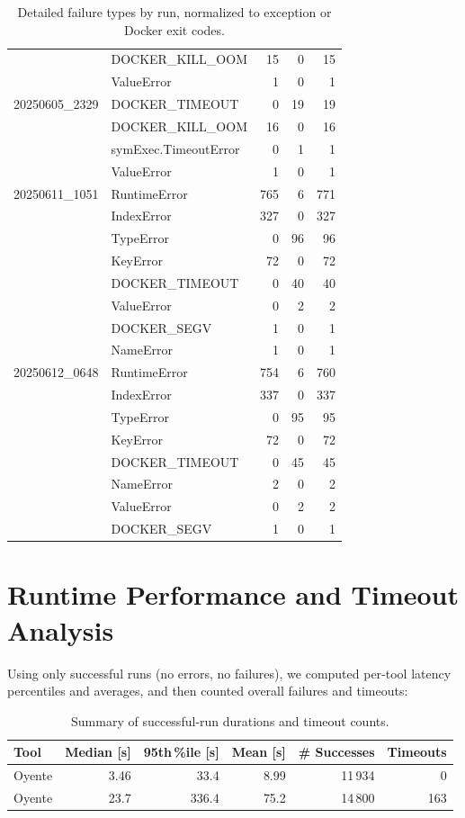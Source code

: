 \documentclass{article}
\newcommand\OY{Oyente}
\newcommand\OYp{\OY\raisebox{0.3ex}{\smaller +}}
\newcommand\SKCrbcB{20250605\_2329}%
\newcommand\SKCsscA{20250611\_1051}%
\newcommand\SKCsscB{20250612\_0648}%
\begin{document}
\begin{table}[ht]
\begin{tabular}{llrrr}
			& DOCKER\_KILL\_OOM & 15 & 0 & 15 \\
			& ValueError & 1 & 0 & 1 \\[3pt]
			\SKCrbcB & DOCKER\_TIMEOUT & 0 & 19 & 19 \\
			& DOCKER\_KILL\_OOM & 16 & 0 & 16 \\
			& symExec.TimeoutError & 0 & 1 & 1 \\
			& ValueError & 1 & 0 & 1 \\[3pt]
			\SKCsscA & RuntimeError & 765 & 6 & 771 \\
			& IndexError & 327 & 0 & 327 \\
			& TypeError & 0 & 96 & 96 \\
			& KeyError & 72 & 0 & 72 \\
			& DOCKER\_TIMEOUT & 0 & 40 & 40 \\
			& ValueError & 0 & 2 & 2 \\
			& DOCKER\_SEGV & 1 & 0 & 1 \\
			& NameError & 1 & 0 & 1 \\[3pt]
			\SKCsscB & RuntimeError & 754 & 6 & 760 \\
			& IndexError & 337 & 0 & 337 \\
			& TypeError & 0 & 95 & 95 \\
			& KeyError & 72 & 0 & 72 \\
			& DOCKER\_TIMEOUT & 0 & 45 & 45 \\
			& NameError & 2 & 0 & 2 \\
			& ValueError & 0 & 2 & 2 \\
			& DOCKER\_SEGV & 1 & 0 & 1 \\
			\bottomrule
		\end{tabular}
		\caption{Detailed failure types by run, normalized to exception or Docker exit codes.}
		\label{tab:failure_types_detailed}
	\end{table}
	\clearpage

	\section{Runtime Performance and Timeout Analysis}

	Using only successful runs (no errors, no failures), we computed per‐tool latency percentiles and averages, and then counted overall failures and timeouts:

	\begin{table}[ht]
		\centering
		\begin{tabular}{lrrrrr}
			\toprule
			\textbf{Tool} & \textbf{Median [s]} & \textbf{95th\,\%ile [s]} & \textbf{Mean [s]} & \textbf{\# Successes}
			& \textbf{Timeouts} \\
			\midrule
			\OY & 3.46 & 33.4 & 8.99 & 11\,934 & 0 \\
			\OYp & 23.7 & 336.4  & 75.2 & 14\,800 & 163 \\
			\bottomrule
		\end{tabular}
		\caption{Summary of successful‐run durations and timeout counts.}
		\label{tab:runtime_summary}
	\end{table}
\end{document}
